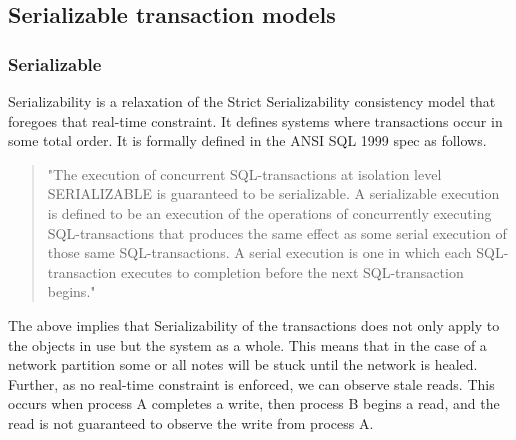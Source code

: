 \documentclass[a4paper,10pt,titlepage]{report}
\begin{document}
\subsection{Serializable transaction models}

\subsubsection{Serializable}

Serializability is a relaxation of the Strict Serializability consistency model that foregoes that real-time constraint. It defines systems where transactions occur in some total order. It is formally defined in the ANSI SQL 1999 spec as follows.

\begin{quote}
"The execution of concurrent SQL-transactions at isolation level SERIALIZABLE is guaranteed to be serializable. A serializable execution is defined to be an execution of the operations of concurrently executing SQL-transactions that produces the same effect as some serial execution of those same SQL-transactions. A serial execution is one in which each SQL-transaction executes to completion before the next SQL-transaction begins."\cite{ansisql1999}\\
\end{quote}
\vspace{5mm}

The above implies that Serializability of the transactions does not only apply to the objects in use but the system as a whole. This means that in the case of a network partition some or all notes will be stuck until the network is healed. Further, as no real-time constraint is enforced,  we can observe stale reads. This occurs when process A completes a write, then process B begins a read, and the read is not guaranteed to observe the write from process A.
\\ \vspace{5mm}
\end{document}
